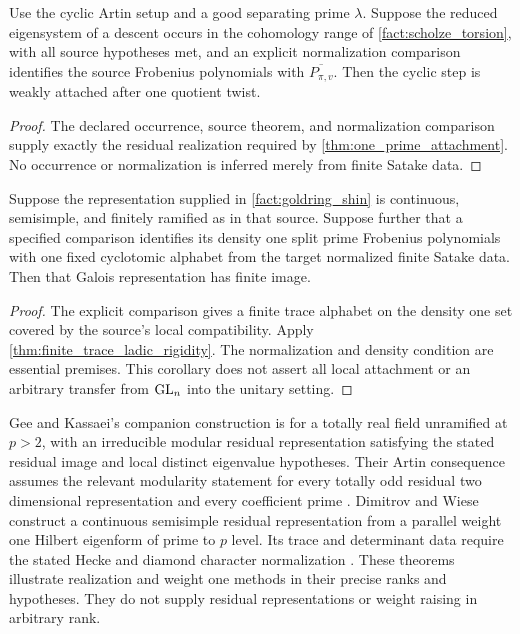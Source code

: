 \begin{corollary}\label{cor:scholze_attachment}
Use the cyclic Artin setup and a good separating prime \(\lambda\). Suppose the reduced eigensystem of a descent occurs in the cohomology range of \cref{fact:scholze_torsion}, with all source hypotheses met, and an explicit normalization comparison identifies the source Frobenius polynomials with \(\overline{P_{\pi,v}}\). Then the cyclic step is weakly attached after one quotient twist.
\end{corollary}

\begin{proof}
The declared occurrence, source theorem, and normalization comparison supply exactly the residual realization required by \cref{thm:one_prime_attachment}. No occurrence or normalization is inferred merely from finite Satake data.
\end{proof}

\begin{corollary}\label{cor:goldring_shin_artin}
Suppose the representation supplied in \cref{fact:goldring_shin} is continuous, semisimple, and finitely ramified as in that source. Suppose further that a specified comparison identifies its density one split prime Frobenius polynomials with one fixed cyclotomic alphabet from the target normalized finite Satake data. Then that Galois representation has finite image.
\end{corollary}

\begin{proof}
The explicit comparison gives a finite trace alphabet on the density one set covered by the source's local compatibility. Apply \cref{thm:finite_trace_ladic_rigidity}. The normalization and density condition are essential premises. This corollary does not assert all local attachment or an arbitrary transfer from \(\operatorname{GL}_n\) into the unitary setting.
\end{proof}

\begin{standardfact}\label{fact:weight_one_companion}
Gee and Kassaei's companion construction is for a totally real field unramified at \(p>2\), with an irreducible modular residual representation satisfying the stated residual image and local distinct eigenvalue hypotheses. Their Artin consequence assumes the relevant modularity statement for every totally odd residual two dimensional representation and every coefficient prime \cite{GeeKassaei2013}. Dimitrov and Wiese construct a continuous semisimple residual representation from a parallel weight one Hilbert eigenform of prime to \(p\) level. Its trace and determinant data require the stated Hecke and diamond character normalization \cite{DimitrovWiese2020}. These theorems illustrate realization and weight one methods in their precise ranks and hypotheses. They do not supply residual representations or weight raising in arbitrary rank.
\end{standardfact}

